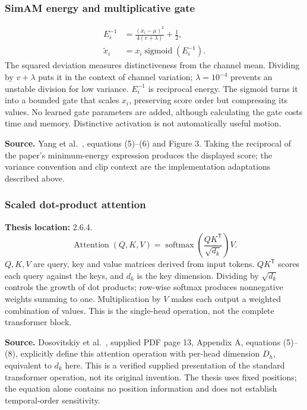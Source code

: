 \documentclass[11pt,a4paper]{article}
\numberwithin{equation}{section}
\begin{document}
\subsubsection{SimAM energy and multiplicative gate}
\label{fg:simamgate}
\begin{equation}
\begin{aligned}
    E_i^{-1}&=\frac{(x_i-\mu)^2}{4(v+\lambda)}+\frac12,\\
    \widetilde x_i&=x_i\operatorname{sigmoid}(E_i^{-1}).
\end{aligned}
    \label{fg:eq:simamgate}
\end{equation}
The squared deviation measures distinctiveness from the channel mean.
Dividing by $v+\lambda$ puts it in the context of channel variation;
$\lambda=10^{-4}$ prevents an unstable division for low variance.
$E_i^{-1}$ is reciprocal energy. The sigmoid turns it into a bounded gate
that scales $x_i$, preserving score order but compressing its values.
No learned gate parameters are added, although calculating the gate costs
time and memory. Distinctive activation is not automatically useful motion.

\textbf{Source.} Yang et al.~\cite{yang2021}, equations (5)--(6) and
Figure 3. Taking the reciprocal of the paper's minimum-energy expression
produces the displayed score; the variance convention and clip context are
the implementation adaptations described above.

\subsubsection{Scaled dot-product attention}
\label{fg:attention}
\textbf{Thesis location:} 2.6.4.
\begin{equation}
    \operatorname{Attention}(Q,K,V)
      =\operatorname{softmax}\left(\frac{QK^{\mathsf T}}{\sqrt{d_k}}\right)V.
    \label{fg:eq:attention}
\end{equation}
$Q,K,V$ are query, key and value matrices derived from input tokens.
$QK^{\mathsf T}$ scores each query against the keys, and $d_k$ is the key
dimension. Dividing by $\sqrt{d_k}$ controls the growth of dot products;
row-wise softmax produces nonnegative weights summing to one. Multiplication
by $V$ makes each output a weighted combination of values. This is the
single-head operation, not the complete transformer block.

\textbf{Source.} Dosovitskiy et al.~\cite{dosovitskiy2021}, supplied PDF
page 13, Appendix A, equations (5)--(8), explicitly define this attention
operation with per-head dimension $D_h$, equivalent to $d_k$ here. This is a
verified supplied presentation of the standard transformer operation, not
its original invention. The thesis uses fixed positions; the equation alone
contains no position information and does not establish temporal-order sensitivity.
\end{document}
